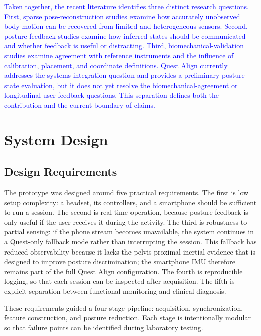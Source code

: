 \documentclass[conference]{IEEEtran}
\newcommand{\CC}[1]{\textcolor{blue}{#1}}
\begin{document}
\CC{Taken together, the recent literature identifies three distinct research questions.
First, sparse pose-reconstruction studies examine how accurately unobserved body motion can
be recovered from limited and heterogeneous sensors. Second, posture-feedback studies
examine how inferred states should be communicated and whether feedback is useful or
distracting. Third, biomechanical-validation studies examine agreement with reference
instruments and the influence of calibration, placement, and coordinate definitions. Quest
Align currently addresses the systems-integration question and provides a preliminary
posture-state evaluation, but it does not yet resolve the biomechanical-agreement or
longitudinal user-feedback questions. This separation defines both the contribution and the
current boundary of claims.}

\section{System Design}
\subsection{Design Requirements}
The prototype was designed around five practical requirements. The first is low setup
complexity: a headset, its controllers, and a smartphone should be sufficient to run a
session. The second is real-time operation, because posture feedback is only useful if the
user receives it during the activity. The third is robustness to partial sensing: if the
phone stream becomes unavailable, the system continues in a Quest-only fallback mode rather
than interrupting the session. This fallback has reduced observability because it lacks the
pelvis-proximal inertial evidence that is designed to improve posture discrimination; the
smartphone IMU therefore remains part of the full Quest Align configuration. The fourth is
reproducible logging, so that each session can be inspected after acquisition. The fifth is
explicit separation between functional monitoring and clinical diagnosis.

These requirements guided a four-stage pipeline: acquisition, synchronization, feature
construction, and posture reduction. Each stage is intentionally modular so that failure
points can be identified during laboratory testing.
\end{document}
